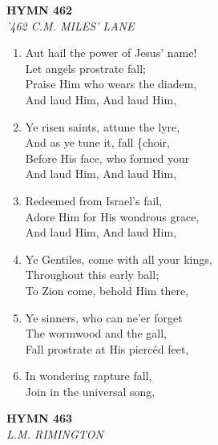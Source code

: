 \documentclass[11pt,a4paper]{article}
\begin{document}
\newpage
\begin{center}
    {\Large \textbf{HYMN 462}}
    \\
    \textit{'462 C.M. MILES' LANE}
\end{center}
\vspace{1em}

\begin{enumerate}
    \item Aut hail the power of Jesus' name! \\
        Let angels prostrate fall; \\
        Praise Him who wears the diadem, \\
        And laud Him, And laud Him,

    \item Ye risen saints, attune the lyre, \\
        And as ye tune it, fall \{choir, \\
        Before His face, who formed your \\
        And laud Him, And laud Him,

    \item Redeemed from Israel's fail, \\
        Adore Him for His wondrous grace, \\
        And laud Him, And laud Him,

    \item Ye Gentiles, come with all your kings, \\
        Throughout this early ball; \\
        To Zion come, behold Him there,

    \item Ye sinners, who can ne'er forget \\
        The wormwood and the gall, \\
        Fall prostrate at His piercéd feet,

    \item In wondering rapture fall, \\
        Join in the universal song,

\end{enumerate}

\newpage
\begin{center}
    {\Large \textbf{HYMN 463}}
    \\
    \textit{L.M. RIMINGTON}
\end{center}
\vspace{1em}
\end{document}
